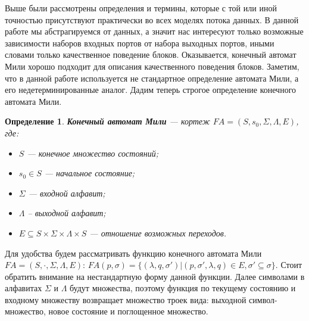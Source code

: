 \documentclass[10pt,a4paper]{article}
\newtheorem{defen}{Определение}
\newcommand{\FA}{F\!A}
\begin{document}
Выше были рассмотрены определения и термины, которые с той или иной точностью присутствуют практически во всех моделях потока данных.
В данной работе мы абстрагируемся от данных, а значит нас интересуют только возможные зависимости наборов входных портов от набора выходных портов,
иными словами только качественное поведение блоков. Оказывается, конечный автомат Мили хорошо подходит для описания качественного поведения блоков.
Заметим, что в данной работе используется не стандартное определение автомата Мили, а его недетерминированные аналог.
Дадим теперь строгое определение конечного автомата Мили.

\begin{defen}
  \textbf{Конечный автомат Мили} --- кортеж $\FA = (S, s_0, \Sigma, \Lambda, E)$, где:
  \begin{itemize}
    \item $S$ --- конечное множество состояний;
    \item $s_0 \in S$ --- начальное состояние;
    \item $\Sigma$ --- входной алфавит;
    \item $\Lambda$ -- выходной алфавит;
    \item $E \subseteq S \times \Sigma \times \Lambda \times S$ --- отношение возможных переходов.
  \end{itemize}
\end{defen}

Для удобства будем рассматривать функцию конечного автомата Мили $\FA = (S, \cdot, \Sigma, \Lambda, E)$:
$\FA(p, \sigma) = \{(\lambda, q, \sigma') \vert (p, \sigma', \lambda, q) \in E, \sigma' \subseteq \sigma\}$.
Стоит обратить внимание на нестандартную форму данной функции. Далее символами в алфавитах $\Sigma$ и $\Lambda$ будут множества, поэтому функция по текущему состоянию и входному множеству возвращает множество троек вида:
выходной символ-множество, новое состояние и поглощенное множество.
\end{document}
